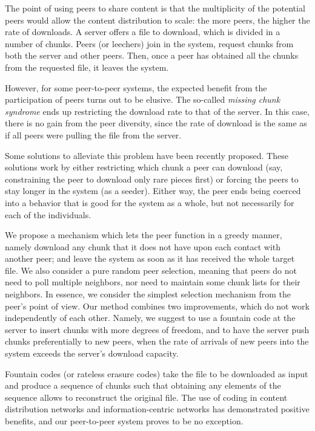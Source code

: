 \documentclass[11pt,conference]{IEEEtran}
\begin{document}
The point of using peers to share content is that the multiplicity of the potential peers would allow the content distribution to scale: the more peers, the higher the rate of downloads. A server offers a file to download, which is divided in a number of chunks. Peers (or leechers) join in the system, request chunks from both the server and other peers. Then, once a peer has obtained all the chunks from the requested file, it leaves the system.

However, for some peer-to-peer systems, the expected benefit from the participation of peers turns out to be elusive\cite{Hajek2010Missing}\cite{Mathieu2006Missing}. The so-called {\em missing chunk syndrome} ends up restricting the download rate to that of the server. In this case, there is no gain from the peer diversity, since the rate of download is the same as if all peers were pulling the file from the server.

Some solutions to alleviate this problem have been recently proposed\cite{Oguz:EECS-2012-6}\cite{Zhu2011Stability}\cite{Zhou2011Stability}. These solutions work by either restricting which chunk a peer can download (say, constraining the peer to download only rare pieces first) or forcing the peers to stay longer in the system (as a seeder). Either way, the peer ends being coerced into a behavior that is good for the system as a whole, but not necessarily for each of the individuals.

We propose a mechanism which lets the peer function in a greedy manner, namely download any chunk that it does not have upon each contact with another peer; and leave the system as soon as it has received the whole target file. We also consider a pure random peer selection, meaning that peers do not need to poll multiple neighbors, nor need to maintain some chunk lists for their neighbors. In essence, we consider the simplest selection mechanism from the peer's point of view. Our method combines two improvements, which do not work independently of each other. Namely, we suggest to use a fountain code\cite{Byers:1998} at the server to insert chunks with more degrees of freedom, and to have the server push chunks preferentially to new peers, when the rate of arrivals of new peers into the system exceeds the server's download capacity.

Fountain codes (or rateless erasure codes) take the file to be downloaded as input and produce a sequence of chunks such that obtaining any  elements of the sequence allows to reconstruct the original file. The use of coding in content distribution networks\cite{Gkantsidis2005Network} and information-centric networks\cite{Montpetit2011Network} has demonstrated positive benefits, and our peer-to-peer system proves to be no exception.
\end{document}
